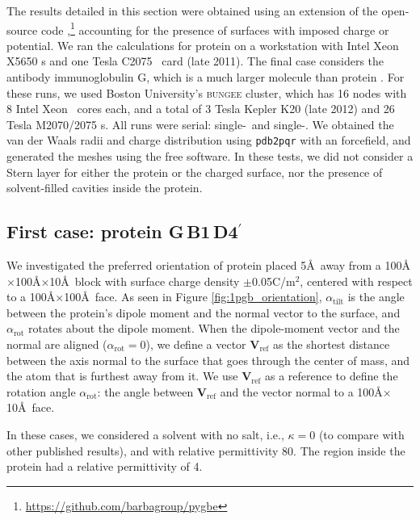 
The results detailed in this section were obtained using an extension of the open-source code \pygbe,\footnote{\href{https://github.com/barbagroup/pygbe}{https://github.com/barbagroup/pygbe}} accounting for the presence of surfaces with imposed charge or potential.\cite{CooperBarba2015a}
We ran the calculations for protein \gb on a workstation with Intel Xeon X5650 \cpu s  and one \nvidia Tesla C2075 \gpu\ card (late 2011). 
The final case considers the antibody immunoglobulin G, which is a much larger molecule than protein \gb. For these runs, we used Boston University's \textsc{bungee} cluster, which has 16 nodes with 8 Intel Xeon \cpu\ cores each, and a total of 3 \nvidia Tesla Kepler K20 (late 2012) and 26 \nvidia Tesla M2070/2075 \gpu s. All runs were serial: single-\cpu\ and single-\gpu. 
We obtained the van der Waals radii and charge distribution using \texttt{pdb2pqr}\cite{Dolinsky04} with an \amber forcefield, and generated the meshes using the free \msms software.\cite{SannerOlsonSpehner1995}
In these tests, we did not consider a Stern layer for either the protein or the charged surface, nor the presence of solvent-filled cavities inside the protein.

\subsection{First case: protein G\,B1\,D4$^{\prime}$} \label{sec:PGB}

We investigated the preferred orientation of protein \gb placed 5\AA\ away from a 100\AA$\times$100\AA$\times$10\AA\ block with surface charge density $\pm$0.05C/m$^2$, centered with respect to a 100\AA$\times$100\AA\ face.
As seen in Figure \ref{fig:1pgb_orientation}, $\alpha_\text{tilt}$ is the angle between the protein's dipole moment and the normal vector to the surface, and $\alpha_\text{rot}$ rotates about the dipole moment. 
When the dipole-moment vector and the normal are aligned ($\alpha_\text{rot}=0$), we define a vector $\mathbf{V}_\text{ref}$ as the shortest distance between the axis normal to the surface that goes through the center of mass, and the atom that is furthest away from it. 
We use $\mathbf{V}_\text{ref}$ as a reference to define the rotation angle $\alpha_\text{rot}$: the angle between $\mathbf{V}_\text{ref}$ and the vector normal to a 100\AA$\times$10\AA\ face.  

In these cases, we considered a solvent with no salt, i.e., $\kappa=0$ (to compare with other published results), and with relative permittivity 80. The region inside the protein had a relative permittivity of 4.

